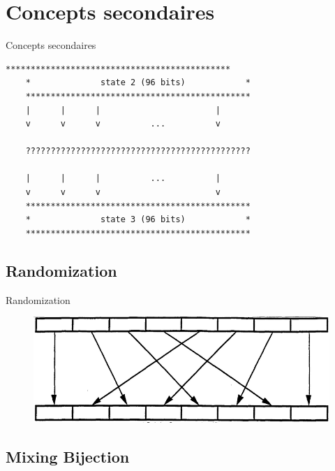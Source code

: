 \documentclass{beamer}
\begin{document}
\section{Concepts secondaires}

\begin{frame}[fragile]{Concepts secondaires}
  \begin{Verbatim}[samepage=true]
    *********************************************
    *              state 2 (96 bits)            *
    *********************************************
    |      |      |                       |
    v      v      v          ...          v
    
    ?????????????????????????????????????????????
    
    |      |      |          ...          |
    v      v      v                       v
    *********************************************
    *              state 3 (96 bits)            *
    *********************************************
  \end{Verbatim}
\end{frame}

\subsection{Randomization}

\begin{frame}{Randomization}
  \begin{figure}[h]
    \centering
    \includegraphics[scale=0.4]{./images/randomization.png}
  \end{figure}
\end{frame}

\subsection{Mixing Bijection}
\end{document}
